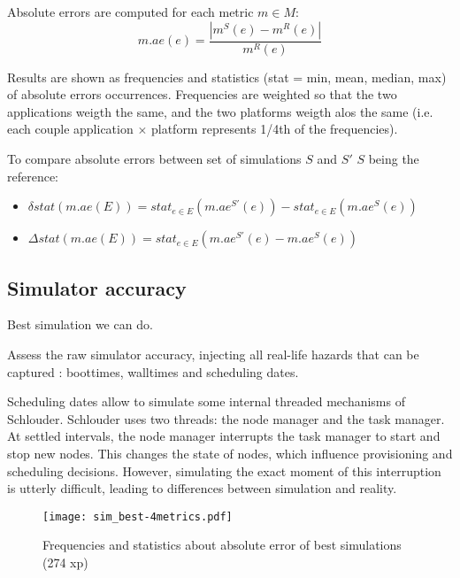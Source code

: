 Absolute errors are computed for each metric $m \in M$: 
$$m.ae(e) = \frac{| m^S(e) - m^R(e) |}{m^R(e)}$$

Results are shown as frequencies and statistics (stat = min, mean, median, max) 
of absolute errors occurrences. Frequencies are weighted so that the two applications
weigth the same, and the two platforms weigth alos the same 
(i.e. each couple application $\times$ platform represents 1/4th of the frequencies).

To compare absolute errors between set of simulations $S$ and $S'$
$S$ being the reference:
\begin{itemize}
 \item $\delta stat(m.ae(E)) = stat_{e \in E} ( m.ae^{S'}(e) ) - stat_{e \in E}( m.ae^S(e) )$
 \item $\Delta stat(m.ae(E)) = stat_{e \in E} ( m.ae^{S'}(e) - m.ae^S(e) )$
\end{itemize}




\subsection{Simulator accuracy}

Best simulation we can do.

Assess the raw simulator accuracy, injecting all real-life hazards that can be 
captured :
boottimes, walltimes and scheduling dates.

Scheduling dates allow to simulate some internal threaded mechanisms of 
Schlouder.
Schlouder uses two threads: the node manager and the task manager.
At settled intervals, the node manager interrupts the task manager to start and 
stop new nodes.
This changes the state of nodes, which influence provisioning and scheduling 
decisions.
However, simulating the exact moment of this interruption is utterly difficult, 
leading to differences between simulation and reality.


\begin{figure}
  \centering

  \texttt{[image: sim\_best-4metrics.pdf]}
  
  
  
\caption{Frequencies and statistics about absolute error of best simulations (274 xp)}
\end{figure} 

 


